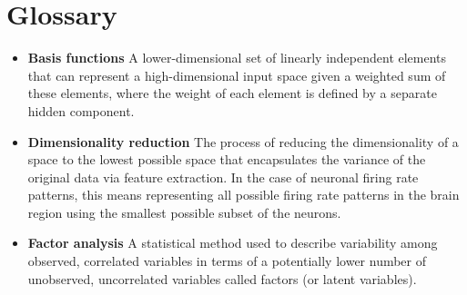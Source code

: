 
\section{Glossary}

\begin{itemize}

\item \textbf{Basis functions} A lower-dimensional set of linearly independent elements that can represent a high-dimensional input space given a weighted sum of these elements, where the weight of each element is defined by a separate hidden component.



\item \textbf{Dimensionality reduction} The process of reducing the dimensionality of a space to the lowest possible space that encapsulates the variance of the original data via feature extraction. In the case of neuronal firing rate patterns, this means representing all possible firing rate patterns in the brain region using the smallest possible subset of the neurons.

\item \textbf{Factor analysis} A statistical method used to describe variability among observed, correlated variables in terms of a potentially lower number of unobserved, uncorrelated variables called factors (or latent variables).


\end{itemize}

